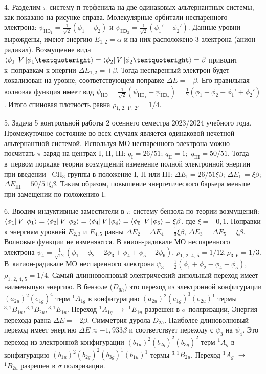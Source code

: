 4. Разделим $\pi$-систему п-терфенила на две одинаковых альтернантных системы, как показано на рисунке справа. Молекулярные орбитали неспаренного электрона: $\psi_{\textrm{НЭ}_1}=\frac{1}{\sqrt2}(\phi_1 -\phi_2)$ и $\psi_{\textrm{НЭ}_2}=\frac{1}{\sqrt2}(\phi_1' -\phi_2')$. Данные уровни вырождены, имеют энергию $E_{1,2}=\alpha$ и на них расположено 3 электрона (анион-радикал). Возмущение вида $\bra{\phi_1}V\ket{\phi_1’}=\bra{\phi_2}V\ket{\phi_2’}=\beta$ приводит к~поправкам к энергии $\Delta E_{1,2}=\pm \beta$. Тогда неспаренный электрон будет локализован на уровне, соответствующем поправке $\Delta E =-\beta$. Его правильная волновая функция имеет вид $\psi_{\textrm{НЭ}}=\frac{1}{\sqrt{2}}(\psi_{\textrm{НЭ}_1}-\psi_{\textrm{НЭ}_2})=\frac{1}{2}(\phi_1 -\phi_2-\phi_1' +\phi_2')$. Итого спиновая плотность равна $\rho_{1,\,2,\,1',\,2'}=1/4$.\par
5. Задача 5 контрольной работы 2 осеннего семестра 2023/2024 учебного года. Промежуточное состояние во всех случаях является одинаковой нечетной альтернантной системой. Используя МО неспаренного электрона можно посчитать $\pi$-заряд на центрах I, II, III: $q_{\text {I}}=26/51$; $q_{{\text {II}}}=1;$ $ q_{{\text {III}}}=50/51$. Тогда в~первом порядке теории возмущений изменение полной электронной энергии при введении –CH$_3$ группы в положение I, II или III: $\Delta E_{\text {I}}=26/51 \xi \beta$; $\Delta E_{{\text {II}}}=\xi \beta$; $\Delta E_{{\text {III}}}=50/51 \xi \beta$. Таким образом, повышение энергетического барьера меньше при замещении по положению I.\par
6. Вводим индуктивные заместители в $\pi$-систему бензола по теории возмущений: $\bra{\phi_1}{V}\ket{\phi_1}=\bra{\phi_2}{V}\ket{\phi_2}=\bra{\phi_4}{V}\ket{\phi_4}=\bra{\phi_5}{V}\ket{\phi_5}=\xi\beta$, где $ \xi=-0,1$. Поправки к энергиям уровней $E_{2,3}$ и $E_{4,5}$ равны $\Delta E_2 =\Delta E_4=\frac{1}{3}\xi\beta$, $\Delta E_3=\Delta E_5=\xi\beta$. Волновые функции не изменяются. В анион-радикале МО неспаренного электрона $\psi_4=\frac{1}{\sqrt{12}}(\phi_1+\phi_2-2\phi_3+\phi_4+\phi_5-2\phi_6)$, $\rho_{1,\,2,\,4,\,5}=1/12, \rho_{3,\,6}=1/3$. В~катион-радикале МО неспаренного электрона $\psi_3=\frac{1}{2}(\phi_1+\phi_2-\phi_4-\phi_5)$, $\rho_{1,\,2,\,4,\,5}=1/4$. Самый длинноволновый электрический дипольный переход имеет наименьшую энергию. В бензоле ($D_{6h}$) это переход из электронной конфигурации $(a_{2u})^2(e_{1g})^4$ терм $^1A_{1g}$ в конфигурацию $(a_{2u})^2(e_{1g})^3(e_{2u})^1$ термы $^{3,1}B_{1u}, {^{3,1}B_{2u}}, {^{3,1}E_{1u}}$. Переход $^1A_{1g}$ $\rightarrow$ ${^{1}E_{1u}}$ разрешен в $\sigma$ поляризации, Энергия перехода равна $\Delta E =-2\beta$. Cимметрия дурола $D_{2h}$. Наиболее длиноволновый переход имеет энергию $\Delta E \approx -1,933\beta$ и соответствует переходу с $\psi_3$ на $\psi_4$. Это переход из электронной конфигурации $(b_{1u})^2(b_{2g})^2(b_{3g})^2$ терм $^1{A_{g}}$ в конфигурацию $(b_{1u})^2(b_{2g})^2(b_{3g})^1(b_{1u})^1$ термы $^{3,1}{B_{2u}}$. Переход $^{1}{A_{g}}$ $\rightarrow$ $^{1}{B_{2u}}$ разрешен в $\sigma$ поляризации.\par
